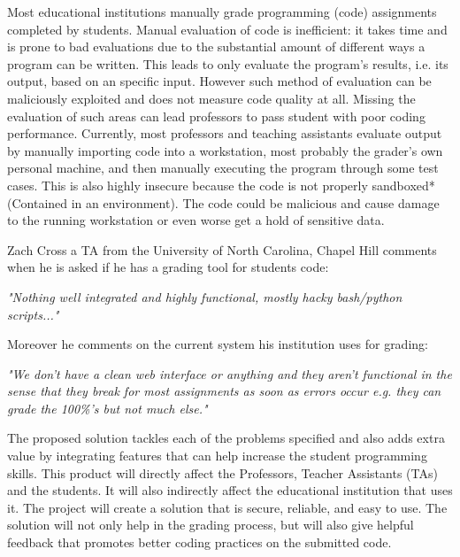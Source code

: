 
Most educational institutions manually grade programming (code) assignments
completed by students. Manual evaluation of code is inefficient: it takes time
and is prone to bad evaluations due to the substantial amount of different ways
a program can be written. This leads to only evaluate the program's results,
i.e. its output, based on an specific input. However such method of evaluation
can be maliciously exploited and does not measure code quality at all. Missing
the evaluation of such areas can lead professors to pass student with poor
coding performance. Currently, most professors and teaching assistants evaluate
output by manually importing code into a workstation, most probably the grader's
own personal machine, and then manually executing the program through some test
cases. This is also highly insecure because the code is not properly sandboxed*
(Contained in an environment). The code could be malicious and cause damage to
the running workstation or even worse get a hold of sensitive data.

Zach Cross a TA from the University of North Carolina, Chapel Hill comments when
he is asked if he has a grading tool for students code:

\textit{"Nothing well integrated and highly functional, mostly hacky bash/python
scripts..."}

Moreover he comments on the current system his institution uses for grading:

\textit{"We don't have a clean web interface or anything and they aren't
functional in the sense that they break for most assignments as soon as errors
occur e.g. they can grade the 100\%'s but not much else."}

The proposed solution tackles each of the problems specified and also adds
extra value by integrating features that can help increase the student
programming skills. This product will directly affect the Professors, Teacher
Assistants (TAs) and the students. It will also indirectly affect the
educational institution that uses it. The project will create a solution that
is secure, reliable, and easy to use. The solution will not only help in the grading process,
but will also give helpful feedback that promotes better coding practices on the
submitted code.
